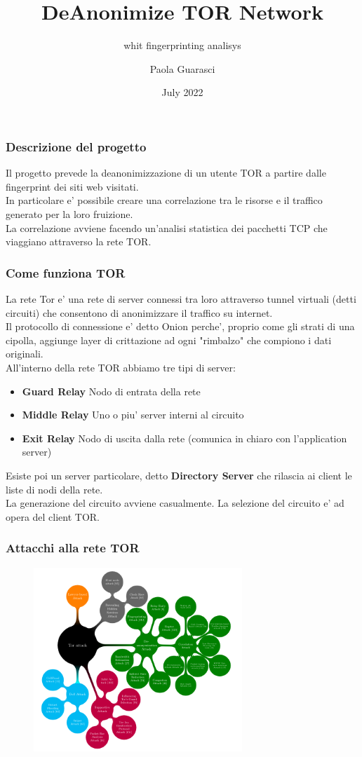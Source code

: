 \documentclass{beamer}[10pt]
\title[DeAnonTor]{DeAnonimize TOR Network}
\subtitle[]{whit fingerprinting analisys}
\author[Paola Guarasci]{Paola Guarasci}
\date[07/2022]{July 2022}
\begin{document}
\frame{\titlepage}

\begin{frame}
  \frametitle{Descrizione del progetto}
  Il progetto prevede la deanonimizzazione di un utente TOR a partire dalle fingerprint dei siti web visitati.
  \\In particolare e' possibile creare una correlazione tra le risorse e il traffico generato per la loro fruizione.
  \\La correlazione avviene facendo un'analisi statistica dei pacchetti TCP che viaggiano attraverso la rete TOR.\@
\end{frame}

\begin{frame}
  \frametitle{Come funziona TOR}
  La rete Tor e' una rete di server connessi tra loro attraverso tunnel virtuali (detti circuiti) che consentono di anonimizzare il traffico su internet.
  \\ Il protocollo di connessione e' detto Onion perche', proprio come gli strati di una cipolla, aggiunge layer di crittazione ad ogni "rimbalzo" che compiono i dati originali. 
  \\ All'interno della rete TOR abbiamo tre tipi di server:
  \begin{itemize}
    \item \textbf{Guard Relay} Nodo di entrata della rete
    \item \textbf{Middle Relay} Uno o piu' server interni al circuito
    \item \textbf{Exit Relay} Nodo di uscita dalla rete (comunica in chiaro con l'application server)
  \end{itemize}
  Esiste poi un server particolare, detto \textbf{Directory Server} che rilascia ai client le liste di nodi della rete. 
  \\ La generazione del circuito avviene casualmente. La selezione del circuito e' ad opera del client TOR. 
\end{frame}

\begin{frame}
  \frametitle{Attacchi alla rete TOR}
  \begin{figure}
    \centering
    \includegraphics[width=0.70\textwidth]{../img/torAttack.png}
  \end{figure}
\end{frame}
\end{document}

